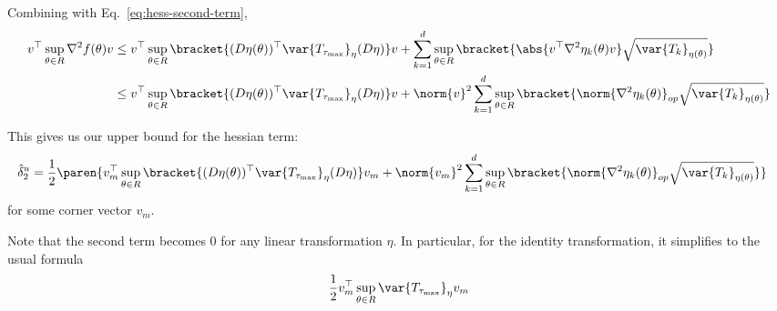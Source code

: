 \documentclass[10pt, a4paper]{article}
\begin{document}
Combining with Eq.~\ref{eq:hess-second-term},
\begin{align*}
    v^\top \sup\limits_{\theta \in R} \nabla^2 f(\theta) v
    &\leq
    v^\top \sup\limits_{\theta \in R} \bracket{(D\eta(\theta))^\top \var{T_{\tau_{\max}}}_{\eta} (D\eta)} v
    +
    \sum\limits_{k=1}^d 
    \sup\limits_{\theta \in R}
    \bracket{%
        \abs{v^\top \nabla^2 \eta_k(\theta) v}
        \sqrt{\var{T_k}_{\eta(\theta)}}
    }
    \\&\leq
    v^\top \sup\limits_{\theta \in R} \bracket{(D\eta(\theta))^\top \var{T_{\tau_{\max}}}_{\eta} (D\eta)} v
    +
    \norm{v}^2
    \sum\limits_{k=1}^d 
    \sup\limits_{\theta \in R}
    \bracket{%
        \norm{\nabla^2 \eta_k(\theta)}_{op}
        \sqrt{\var{T_k}_{\eta(\theta)}}
    }
\end{align*}

This gives us our upper bound for the hessian term:
\begin{align*}
    \hat{\delta}_2^u
    &=
    \frac{1}{2}
    \paren{%
        v_m^\top \sup\limits_{\theta \in R} \bracket{(D\eta(\theta))^\top \var{T_{\tau_{\max}}}_{\eta} (D\eta)} v_m
        +
        \norm{v_m}^2
        \sum\limits_{k=1}^d 
        \sup\limits_{\theta \in R}
        \bracket{%
            \norm{\nabla^2 \eta_k(\theta)}_{op}
            \sqrt{\var{T_k}_{\eta(\theta)}}
        }
    }
\end{align*}
for some corner vector $v_m$.

Note that the second term becomes 0 for any linear transformation $\eta$.
In particular, for the identity transformation, it simplifies to the usual formula
\begin{align*}
    \frac{1}{2}
    v_m^\top \sup\limits_{\theta \in R} \var{T_{\tau_{\max}}}_\eta v_m
\end{align*}



\end{document}
